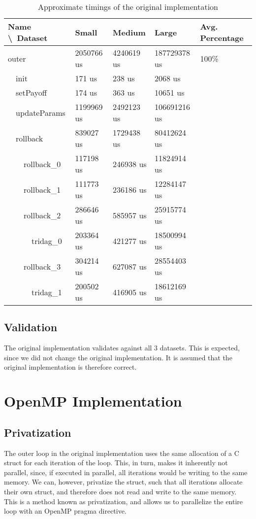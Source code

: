 \documentclass[11pt]{article}
\begin{document}
\begin{table}[h]
\centering
\begin{tabular}{|l|l|l|l|l|}
\hline
Name \textbackslash\ Dataset & Small      & Medium     & Large        & Avg. Percentage \\ \hline
outer                        & 2050766 us & 4240619 us & 187729378 us & 100\%           \\ \hline
\ \ init                     & 171 us     & 238 us     & 2068 us      & \\ \hline
\ \ setPayoff                & 174 us     & 363 us     & 10651 us     & \\ \hline
\ \ updateParams             & 1199969 us & 2492123 us & 106691216 us & \\ \hline
\ \ rollback                 & 839027 us  & 1729438 us & 80412624 us  & \\ \hline
\ \ \ \ rollback\_0          & 117198 us  & 246938 us  & 11824914 us  & \\ \hline
\ \ \ \ rollback\_1          & 111773 us  & 236186 us  & 12284147 us  & \\ \hline
\ \ \ \ rollback\_2          & 286646 us  & 585957 us  & 25915774 us  & \\ \hline
\ \ \ \ \ \ tridag\_0        & 203364 us  & 421277 us  & 18500994 us  & \\ \hline
\ \ \ \ rollback\_3          & 304214 us  & 627087 us  & 28554403 us  & \\ \hline
\ \ \ \ \ \ tridag\_1        & 200502 us  & 416905 us  & 18612169 us  & \\ \hline
\end{tabular}
\caption{Approximate timings of the original implementation}
\label{table:origtime}
\end{table}

\subsection{Validation}
The original implementation validates against all 3 datasets. This is expected,
since we did not change the original implementation. It is assumed that the 
original implementation is therefore correct.


\section{OpenMP Implementation}
\subsection{Privatization}
The outer loop in the original implementation uses the same allocation of a C 
struct for each
iteration of the loop. This, in turn, makes it inherently not parallel, since,
if executed in parallel, all iterations would be writing to the same memory. 
We can, however, privatize the struct, such that all iterations allocate their
own struct, and therefore does not read and write to the same memory. This is 
a method known as privatization, and allows us to parallelize the entire loop
with an OpenMP pragma directive.
\end{document}
